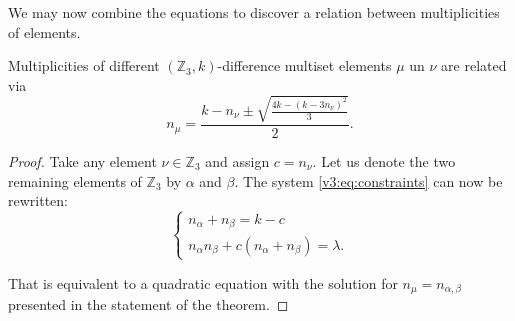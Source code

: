     We may now combine the equations to discover a relation between multiplicities of elements.

    \begin{theorem}
        \label{v3:theorem:relations}
        Multiplicities of different $(\mathbb Z_3,k)$-difference multiset elements $\mu$ un $\nu$ are related via
        \begin{equation}
            \label{v3:eq:relations}
            n_{\mu} = \frac{k-n_\nu \pm \sqrt{\frac{4k-(k-3n_\nu)^2}{3}}}{2}.
        \end{equation}
    \end{theorem}

    \begin{proof}
        Take any element $\nu \in \mathbb Z_3$ and assign $c = n_\nu$. Let us denote the two remaining elements of $\mathbb Z_3$ by $\alpha$ and $\beta$. The system \eqref{v3:eq:constraints} can now be rewritten:
        \begin{equation}
            \begin{cases}
                n_\alpha + n_\beta = k - c \\
                n_\alpha n_\beta + c (n_\alpha + n_\beta)  = \lambda.
            \end{cases}
        \end{equation}

That is equivalent to a quadratic equation with the solution for $n_{\mu}=n_{\alpha,\beta}$ presented in the statement of the theorem.

        
        
        
        
    \end{proof}

